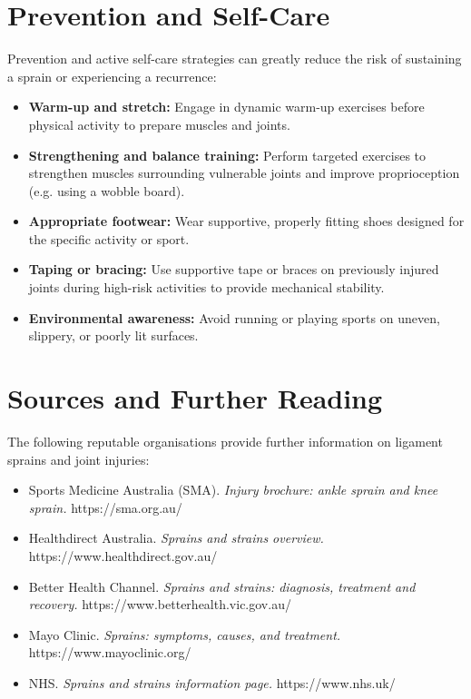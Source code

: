 \section*{Prevention and Self-Care}
Prevention and active self-care strategies can greatly reduce the risk of sustaining a sprain or experiencing a recurrence:
\begin{itemize}
    \item \textbf{Warm-up and stretch:} Engage in dynamic warm-up exercises before physical activity to prepare muscles and joints.
    \item \textbf{Strengthening and balance training:} Perform targeted exercises to strengthen muscles surrounding vulnerable joints and improve proprioception (e.g. using a wobble board).
    \item \textbf{Appropriate footwear:} Wear supportive, properly fitting shoes designed for the specific activity or sport.
    \item \textbf{Taping or bracing:} Use supportive tape or braces on previously injured joints during high-risk activities to provide mechanical stability.
    \item \textbf{Environmental awareness:} Avoid running or playing sports on uneven, slippery, or poorly lit surfaces.
\end{itemize}

\section*{Sources and Further Reading}
The following reputable organisations provide further information on ligament sprains and joint injuries:
\begin{itemize}
    \item Sports Medicine Australia (SMA). \textit{Injury brochure: ankle sprain and knee sprain.} https://sma.org.au/
    \item Healthdirect Australia. \textit{Sprains and strains overview.} https://www.healthdirect.gov.au/
    \item Better Health Channel. \textit{Sprains and strains: diagnosis, treatment and recovery.} https://www.betterhealth.vic.gov.au/
    \item Mayo Clinic. \textit{Sprains: symptoms, causes, and treatment.} https://www.mayoclinic.org/
    \item NHS. \textit{Sprains and strains information page.} https://www.nhs.uk/
\end{itemize}
